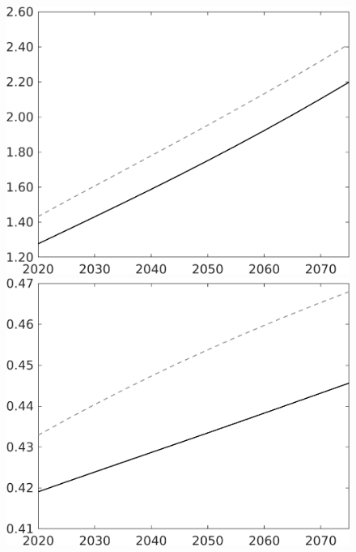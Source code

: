 \documentclass[12pt]{article}
\begin{document}
\begin{figure}[h!!]
\begin{minipage}[]{0.32\textwidth}
	\end{minipage}
	\begin{minipage}[]{0.32\textwidth}
		\includegraphics[width=1\textwidth]{../../codding_model/own_basedOnFried/optimalPol_010922_revision/figures/all_13Sept22/LevTaufNoTauf_TaulCalib_Equlab_regime0_E_spillover0_nsk1_xgr0_knspil1_sep1_LFlimit0_emsbase0_countec0_GovRev0_etaa0.79_lgd0.png}
	\end{minipage}	
	\begin{minipage}[]{0.32\textwidth}
		\includegraphics[width=1\textwidth]{../../codding_model/own_basedOnFried/optimalPol_010922_revision/figures/all_13Sept22/LevTaufNoTauf_TaulCalib_Equlab_regime0_EY_spillover0_nsk1_xgr0_knspil1_sep1_LFlimit0_emsbase0_countec0_GovRev0_etaa0.79_lgd0.png}

\end{minipage}
\end{figure}
\end{document}
